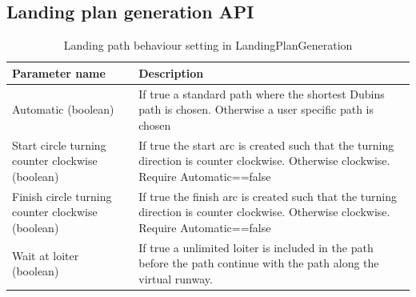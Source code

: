 \subsection{Landing plan generation API}
\begin{table}[H]
\centering
\begin{tabular}{| p{2.7cm} | | p{6cm} |}
\hline
\textbf{Parameter name} 							& \textbf{Description} \\ \hline
 Automatic (boolean)								& If true a standard path where the shortest Dubins path is chosen. Otherwise a user specific path is chosen \\ \hline
Start circle turning counter clockwise (boolean)	& If true the start arc is created such that the turning direction is counter clockwise. Otherwise clockwise. Require Automatic==false \\ \hline
Finish circle turning counter clockwise (boolean)	& If true the finish arc is created such that the turning direction is counter clockwise. Otherwise clockwise. Require Automatic==false \\ \hline
Wait at loiter (boolean)							& If true a unlimited loiter is included in the path before the path continue with the path along the virtual runway. \\ \hline

\end{tabular}
\caption{Landing path behaviour setting in LandingPlanGeneration}
\label{Tb:DubinConfig}
\end{table}

